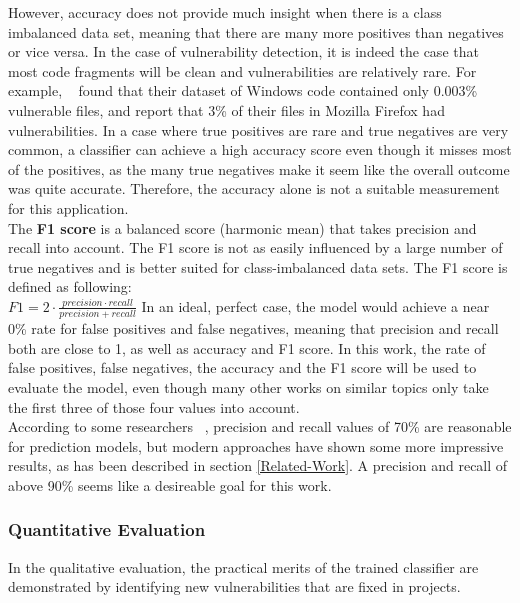 \documentclass[
	a4paper,
	pagesize,
	pdftex,
	12pt,
	twoside, %
	BCOR=5mm, %
	ngerman,
	fleqn,
	final,
	]{scrartcl}
\begin{document}
\mbox{}\newline
However, accuracy does not provide much insight when there is a class imbalanced data set, meaning that there are many more positives than negatives or vice versa. In the case of vulnerability detection, it is indeed the case that most code fragments will be clean and vulnerabilities are relatively rare. For example, ~\cite{Morrison.2015} found that their dataset of Windows code contained only 0.003\% vulnerable files, and \cite{Shin.2010} report that 3\% of their files in Mozilla Firefox had vulnerabilities. In a case where true positives are rare and true negatives are very common, a classifier can achieve a high accuracy score even though it misses most of the positives, as the many true negatives make it seem like the overall outcome was quite accurate. Therefore, the accuracy alone is not a suitable measurement for this application.\\
The \textbf{F1 score} is a balanced score (harmonic mean) that takes precision and recall into account. The F1 score is not as easily influenced by a large number of true negatives and is better suited for class-imbalanced data sets. The F1 score is defined as following:\\
\mbox{}\newline
$F1 = 2 \cdot \frac{precision \cdot recall}{precision + recall}$
\mbox{}\newline
In an ideal, perfect case, the model would achieve a near 0\% rate for false positives and false negatives, meaning that precision and recall both are close to 1, as well as accuracy and F1 score. In this work, the rate of false positives, false negatives, the accuracy and the F1 score will be used to evaluate the model, even though many other works on similar topics only take the first three of those four values into account.\\
According to some researchers ~\cite{Morrison.2015,Shin.2013,Neuhaus.2007}, precision and recall values of 70\% are reasonable for prediction models, but modern approaches have shown some more impressive results, as has been described in section \ref{Related-Work}. A precision and recall of above 90\% seems like a desireable goal for this work.

\subsubsection{Quantitative Evaluation}
In the qualitative evaluation, the practical merits of the trained classifier are demonstrated by identifying new vulnerabilities that are fixed in projects. 
\end{document}
